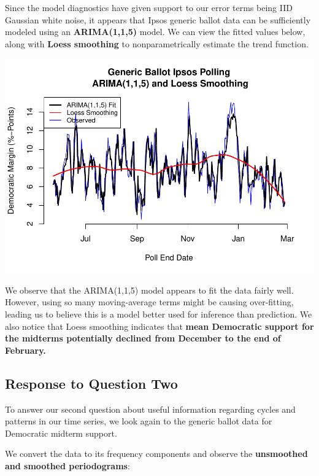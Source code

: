 \documentclass[]{article}
\begin{document}
Since the model diagnostics have given support to our error terms being
IID Gaussian white noise, it appears that Ipsos generic ballot data can
be sufficiently modeled using an \textbf{ARIMA(1,1,5)} model. We can
view the fitted values below, along with \textbf{Loess smoothing} to
nonparametrically estimate the trend function.

\begin{center}\includegraphics{midterm_project_final_files/figure-latex/fitted-1} \end{center}

We observe that the ARIMA(1,1,5) model appears to fit the data fairly
well. However, using so many moving-average terms might be causing
over-fitting, leading us to believe this is a model better used for
inference than prediction. We also notice that Loess smoothing indicates
that \textbf{mean Democratic support for the midterms potentially
declined from December to the end of February.}

\subsection{Response to Question Two}\label{response-to-question-two}

To answer our second question about useful information regarding cycles
and patterns in our time series, we look again to the generic ballot
data for Democratic midterm support.

We convert the data to its frequency components and observe the
\textbf{unsmoothed and smoothed periodograms}:
\end{document}
